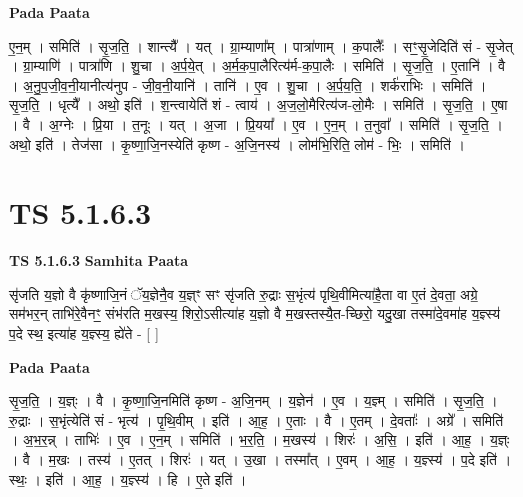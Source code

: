 \documentclass[17pt]{extarticle}
\begin{document}
\textbf{Pada Paata} \newline

ए॒न॒म् । समिति॑ । सृ॒ज॒ति॒ । शान्त्यै᳚ । यत् । ग्रा॒म्याणा᳚म् । पात्रा॑णाम् । क॒पालैः᳚ । सꣳ॒॒सृ॒जेदिति॑ सं - सृ॒जेत् । ग्रा॒म्याणि॑ । पात्रा॑णि । शु॒चा । अ॒र्प॒ये॒त् । अ॒र्म॒क॒पा॒लैरित्य॑र्म-क॒पा॒लैः । समिति॑ । सृ॒ज॒ति॒ । ए॒तानि॑ । वै । अ॒नु॒प॒जी॒व॒नी॒यानीत्य॑नुप - जी॒व॒नी॒यानि॑ । तानि॑ । ए॒व । शु॒चा । अ॒र्प॒य॒ति॒ । शर्क॑राभिः । समिति॑ । सृ॒ज॒ति॒ । धृत्यै᳚ । अथो॒ इति॑ । श॒न्त्वायेति॑ शं - त्वाय॑ । अ॒ज॒लो॒मैरित्य॑ज-लो॒मैः । समिति॑ । सृ॒ज॒ति॒ । ए॒षा । वै । अ॒ग्नेः । प्रि॒या । त॒नूः । यत् । अ॒जा । प्रि॒यया᳚ । ए॒व । ए॒न॒म् । त॒नुवा᳚ । समिति॑ । सृ॒ज॒ति॒ । अथो॒ इति॑ । तेज॑सा । कृ॒ष्णा॒जि॒नस्येति॑ कृष्ण - अ॒जि॒नस्य॑ । लोम॑भि॒रिति॒ लोम॑ - भिः॒ । समिति॑ ।  \newline




\section*{ TS 5.1.6.3 }

\textbf{TS 5.1.6.3 } \newline
\textbf{Samhita Paata} \newline

सृ॑जति य॒ज्ञो वै कृ॑ष्णाजि॒नं ॅय॒ज्ञेनै॒व य॒ज्ञ्ꣳ सꣳ सृ॑जति रु॒द्राः स॒भृंत्य॑ पृथि॒वीमित्या॑है॒ता वा ए॒तं दे॒वता॒ अग्रे॒ सम॑भर॒न् ताभि॑रे॒वैनꣳ॒॒ संभ॑रति म॒खस्य॒ शिरो॒ऽसीत्या॑ह य॒ज्ञो वै म॒खस्तस्यै॒त-च्छिरो॒ यदु॒खा तस्मा॑दे॒वमा॑ह य॒ज्ञ्स्य॑ प॒दे स्थ॒ इत्या॑ह य॒ज्ञ्स्य॒ ह्ये॑ते - [  ] \newline

\textbf{Pada Paata} \newline

सृ॒ज॒ति॒ । य॒ज्ञ्ः । वै । कृ॒ष्णा॒जि॒नमिति॑ कृष्ण - अ॒जि॒नम् । य॒ज्ञेन॑ । ए॒व । य॒ज्ञ्म् । समिति॑ । सृ॒ज॒ति॒ । रु॒द्राः । स॒भृंत्येति॑ सं - भृत्य॑ । पृ॒थि॒वीम् । इति॑ । आ॒ह॒ । ए॒ताः । वै । ए॒तम् । दे॒वताः᳚ । अग्रे᳚ । समिति॑ । अ॒भ॒र॒न्न् । ताभिः॑ । ए॒व । ए॒न॒म् । समिति॑ । भ॒र॒ति॒ । म॒खस्य॑ । शिरः॑ । अ॒सि॒ । इति॑ । आ॒ह॒ । य॒ज्ञ्ः । वै । म॒खः । तस्य॑ । ए॒तत् । शिरः॑ । यत् । उ॒खा । तस्मा᳚त् । ए॒वम् । आ॒ह॒ । य॒ज्ञ्स्य॑ । प॒दे इति॑ । स्थः॒ । इति॑ । आ॒ह॒ । य॒ज्ञ्स्य॑ । हि । ए॒ते इति॑ ।  \newline




\end{document}

